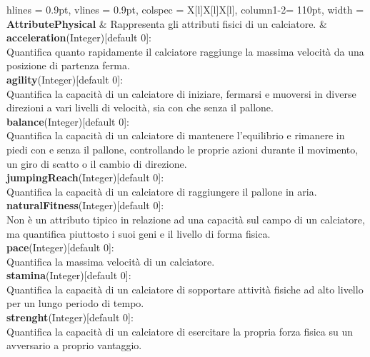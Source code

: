 \begin{tblr}{
    hlines = {0.9pt}, vlines = {0.9pt}, colspec = {X[l]X[l]X[l]}, column{1-2}= {110pt},
    width = \textwidth
}
	{
		\textbf{AttributePhysical}
	}
	&
	{
		Rappresenta gli attributi fisici di un calciatore.
	}
	&
	{
		\textbf{acceleration}(Integer)[default 0]:\\
			Quantifica quanto rapidamente il calciatore
			raggiunge la massima velocità
			da una posizione di partenza ferma.\\
		\medskip\textbf{agility}(Integer)[default 0]:\\
			Quantifica la capacità di un calciatore di iniziare,
			fermarsi e muoversi in diverse direzioni
			a vari livelli di velocità,
			sia con che senza il pallone.\\
		\medskip\textbf{balance}(Integer)[default 0]:\\
			Quantifica la capacità di un calciatore
			di mantenere l'equilibrio e rimanere in piedi
			con e senza il pallone, controllando
			le proprie azioni durante il movimento,
			un giro di scatto o il cambio di direzione.\\
		\medskip\textbf{jumpingReach}(Integer)[default 0]:\\
			Quantifica la capacità di un calciatore
			di raggiungere il pallone in aria.\\
		\medskip\textbf{naturalFitness}(Integer)[default 0]:\\
			Non è un attributo tipico in relazione
			ad una capacità sul campo di un calciatore,
			ma quantifica piuttosto i suoi geni e
			il livello di forma fisica.\\
		\medskip\textbf{pace}(Integer)[default 0]:\\
			Quantifica la massima velocità di un calciatore.\\
		\medskip\textbf{stamina}(Integer)[default 0]:\\
			Quantifica la capacità di un calciatore
			di sopportare attività fisiche
			ad alto livello per un lungo periodo di tempo.\\
		\medskip\textbf{strenght}(Integer)[default 0]:\\
			Quantifica la capacità di un calciatore
			di esercitare la propria forza fisica
			su un avversario a proprio vantaggio.
	}
	\\
\end{tblr}

\newpage


